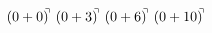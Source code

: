 \documentclass[preview]{standalone}
\begin{document}
\begin{align*}
(0+0)^{\hspace{-0.1cm}\urcorner} \ (0+3)^{\hspace{-0.1cm}\urcorner} \ (0+6)^{\hspace{-0.1cm}\urcorner} \ (0+10)^{\hspace{-0.1cm}\urcorner}
\end{align*}
\end{document}
